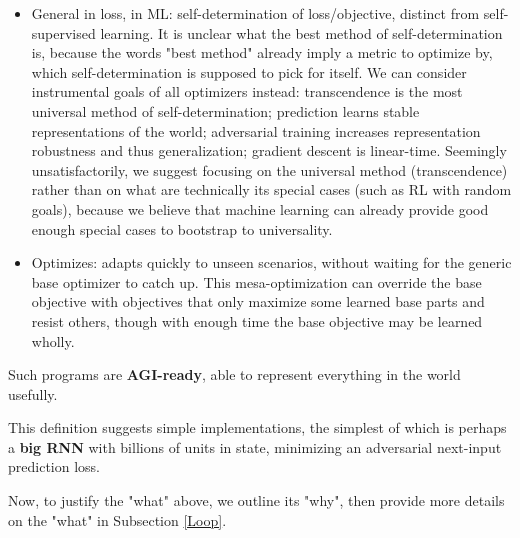 \documentclass{article}
\begin{document}
\begin{itemize}
\begin{itemize}
\item General in loss, in ML: self-determination of loss/objective, distinct from self-supervised learning. It is unclear what the best method of self-determination is, because the words "best method" already imply a metric to optimize by, which self-determination is supposed to pick for itself. We can consider instrumental goals of all optimizers instead: transcendence is the most universal method of self-determination; prediction learns stable representations of the world; adversarial training increases representation robustness and thus generalization; gradient descent is linear-time. Seemingly unsatisfactorily, we suggest focusing on the universal method (transcendence) rather than on what are technically its special cases (such as RL with random goals), because we believe that machine learning can already provide good enough special cases to bootstrap to universality.
\item Optimizes: adapts quickly to unseen scenarios, without waiting for the generic base optimizer to catch up. This mesa-optimization can override the base objective with objectives that only maximize some learned base parts and resist others, though with enough time the base objective may be learned wholly.
\end{itemize}
\end{itemize}

Such programs are \textbf{AGI-ready}, able to represent everything in the world usefully.

This definition suggests simple implementations, the simplest of which is perhaps a \textbf{big RNN} with billions of units in state, minimizing an adversarial next-input prediction loss.

Now, to justify the "what" above, we outline its "why", then provide more details on the "what" in Subsection \ref{Loop}.
\end{document}
